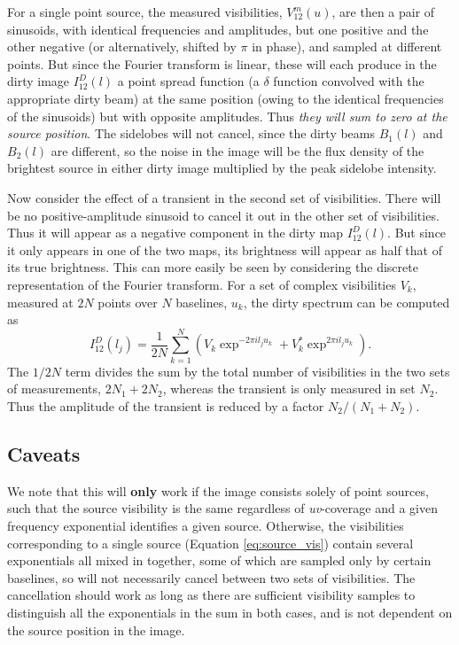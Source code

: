 \documentclass{article}
\begin{document}
For a single point source, the measured visibilities, $V^m_{12}(u)$,
are then a pair of sinusoids, with identical frequencies and
amplitudes, but one positive and the other negative (or alternatively,
shifted by $\pi$ in phase), and sampled at different points.  But
since the Fourier transform is linear, these will each produce in the
dirty image $I^D_{12}(l)$ a point spread function (a $\delta$ function
convolved with the appropriate dirty beam) at the same position (owing
to the identical frequencies of the sinusoids) but with opposite
amplitudes.  Thus {\it they will sum to zero at the source position}.
The sidelobes will not cancel, since the dirty beams $B_1(l)$ and
$B_2(l)$ are different, so the noise in the image will be the flux
density of the brightest source in either dirty image multiplied by
the peak sidelobe intensity.

Now consider the effect of a transient in the second set of
visibilities.  There will be no positive-amplitude sinusoid to cancel
it out in the other set of visibilities.  Thus it will appear as a
negative component in the dirty map $I^D_{12}(l)$.  But since it only
appears in one of the two maps, its brightness will appear as half
that of its true brightness.  This can more easily be seen by
considering the discrete representation of the Fourier transform.  For
a set of complex visibilities $V_k$, measured at $2N$ points over $N$
baselines, $u_k$, the dirty spectrum can be computed as
\begin{equation}
I^D_{12}(l_j) = \frac{1}{2N}\sum_{k=1}^N (V_k \exp^{-2\pi i l_j u_k}+V_k^{\ast} \exp^{2\pi i l_j u_k}).
\end{equation}
The $1/2N$ term divides the sum by the total number of visibilities in
the two sets of measurements, $2N_1+2N_2$, whereas the transient is
only measured in set $N_2$.  Thus the amplitude of the transient is
reduced by a factor $N_2/(N_1+N_2)$.

\subsection{Caveats}
We note that this will {\bf only} work if the image consists solely of
point sources, such that the source visibility is the same regardless
of {\it uv}-coverage and a given frequency exponential identifies a
given source.  Otherwise, the visibilities corresponding to a single
source (Equation \ref{eq:source_vis}) contain several exponentials all
mixed in together, some of which are sampled only by certain
baselines, so will not necessarily cancel between two sets of
visibilities.  The cancellation should work as long as there are
sufficient visibility samples to distinguish all the exponentials in
the sum in both cases, and is not dependent on the source position in
the image.
\end{document}
